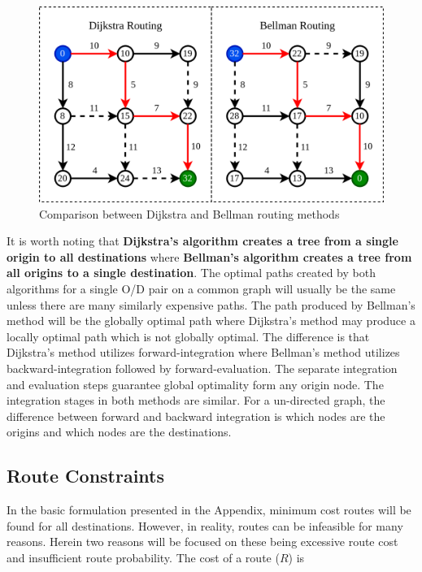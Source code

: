 \documentclass[12pt]{article}
\begin{document}
\begin{figure}[H]
	\centering
	\includegraphics[width = \linewidth]{figs/routing_diagram.png}
	\caption{Comparison between Dijkstra and Bellman routing methods}
	\label{fig:dijkstra_bellman}
\end{figure}

It is worth noting that \textbf{Dijkstra's algorithm creates a tree from a single origin to all destinations} where \textbf{Bellman's algorithm creates a tree from all origins to a single destination}. The optimal paths created by both algorithms for a single O/D pair on a common graph will usually be the same unless there are many similarly expensive paths. The path produced by Bellman's method will be the globally optimal path where Dijkstra's method may produce a locally optimal path which is not globally optimal. The difference is that Dijkstra's method utilizes forward-integration where Bellman's method utilizes backward-integration followed by forward-evaluation. The separate integration and evaluation steps guarantee global optimality form any origin node. The integration stages in both methods are similar. For a un-directed graph, the difference between forward and backward integration is which nodes are the origins and which nodes are the destinations.

\subsection*{Route Constraints}

In the basic formulation presented in the Appendix, minimum cost routes will be found for all destinations. However, in reality, routes can be infeasible for many reasons. Herein two reasons will be focused on these being excessive route cost and insufficient route probability. The cost of a route ($R$) is
\end{document}
